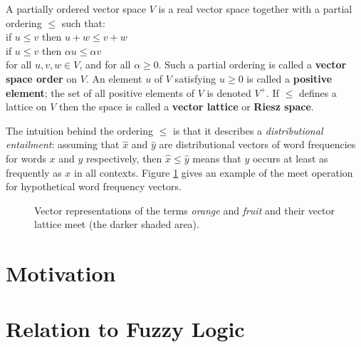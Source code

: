 \documentclass[preprint,leqno]{elsarticle}
\begin{document}
\begin{definition}
A partially ordered vector space $V$ is a real vector space together with a partial ordering $\le$ such that:
\vspace{0.1cm}\\
\indent if $u \le v$ then $u + w \le v + w$\\
\indent if $u \le v$ then $\alpha u \le \alpha v$
\vspace{0.1cm}\\
for all $u,v,w \in V$, and for all $\alpha \ge 0$. Such a partial ordering is called a \textbf{vector space order} on $V$. An element $u$ of $V$ satisfying $u \ge 0$ is called a \textbf{positive element}; the set of all positive elements of $V$ is denoted $V^+$. If $\le$ defines a lattice on $V$ then the space is called a \textbf{vector lattice} or \textbf{Riesz space}.
\end{definition}

The intuition behind the ordering $\le$ is that it describes a
\emph{distributional entailment}: assuming that $\hat{x}$ and
$\hat{y}$ are distributional vectors of word frequencies for words $x$
and $y$ respectively, then $\hat{x} \le \hat{y}$ means that $y$ occurs
at least as frequently as $x$ in all contexts. Figure
\ref{fig:orangefruit} gives an example of the meet operation for
hypothetical word frequency vectors.

\begin{figure}
\begin{center}

\caption{Vector representations of the terms \emph{orange} and
  \emph{fruit} and their vector lattice meet (the darker shaded
  area).}
\label{fig:orangefruit}
\end{center}
\end{figure}


\section{Motivation}


\section{Relation to Fuzzy Logic}
\end{document}

